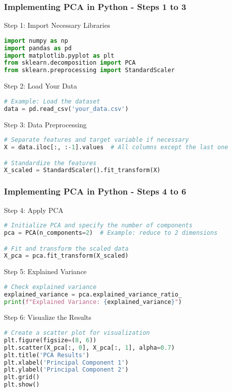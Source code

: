 \documentclass[aspectratio=169]{beamer}
\begin{document}
\begin{frame}[fragile]
    \frametitle{Implementing PCA in Python - Steps 1 to 3}
    \begin{block}{Step 1: Import Necessary Libraries}
        \begin{lstlisting}[language=Python]
import numpy as np
import pandas as pd
import matplotlib.pyplot as plt
from sklearn.decomposition import PCA
from sklearn.preprocessing import StandardScaler
        \end{lstlisting}
    \end{block}

    \begin{block}{Step 2: Load Your Data}
        \begin{lstlisting}[language=Python]
# Example: Load the dataset
data = pd.read_csv('your_data.csv')
        \end{lstlisting}
    \end{block}

    \begin{block}{Step 3: Data Preprocessing}
        \begin{lstlisting}[language=Python]
# Separate features and target variable if necessary
X = data.iloc[:, :-1].values  # All columns except the last one

# Standardize the features
X_scaled = StandardScaler().fit_transform(X)
        \end{lstlisting}
    \end{block}
\end{frame}

\begin{frame}[fragile]
    \frametitle{Implementing PCA in Python - Steps 4 to 6}
    \begin{block}{Step 4: Apply PCA}
        \begin{lstlisting}[language=Python]
# Initialize PCA and specify the number of components
pca = PCA(n_components=2)  # Example: reduce to 2 dimensions

# Fit and transform the scaled data
X_pca = pca.fit_transform(X_scaled)
        \end{lstlisting}
    \end{block}
    
    \begin{block}{Step 5: Explained Variance}
        \begin{lstlisting}[language=Python]
# Check explained variance
explained_variance = pca.explained_variance_ratio_
print(f"Explained Variance: {explained_variance}")
        \end{lstlisting}
    \end{block}

    \begin{block}{Step 6: Visualize the Results}
        \begin{lstlisting}[language=Python]
# Create a scatter plot for visualization
plt.figure(figsize=(8, 6))
plt.scatter(X_pca[:, 0], X_pca[:, 1], alpha=0.7)
plt.title('PCA Results')
plt.xlabel('Principal Component 1')
plt.ylabel('Principal Component 2')
plt.grid()
plt.show()
        \end{lstlisting}
    \end{block}
\end{frame}
\end{document}
